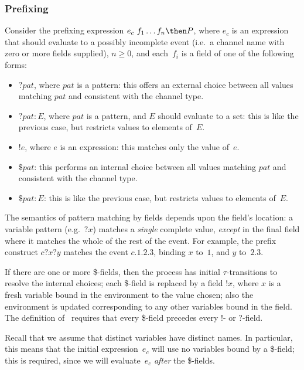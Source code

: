 \subsubsection{Prefixing}  
\label{sec:prefixing}

Consider the prefixing expression $e_c ~ f_1 \ldots f_n \then P$, where $e_c$
is an expression that should evaluate to a possibly incomplete event (i.e.~a
channel name with zero or more fields supplied), $n \ge 0$, and each~$f_i$ is
a field of one of the following forms:
  \begin{itemize}
  \item $? pat$, where $pat$ is a pattern: this offers an external choice
    between all values matching $pat$ and consistent with the channel type. 

  \item $?pat : E$, where $pat$ is a pattern, and $E$ should evaluate to a
    set: this is like the previous case, but restricts values to elements
    of~$E$. 

  \item $!e$, where $e$ is an expression: this matches only the value of~$e$. 

  \item $\$ pat$: this performs an internal choice between all values matching
    $pat$ and consistent with the channel type.
 
  \item $\$ pat : E$: this is like the previous case, but restricts values to
    elements of~$E$.
  \end{itemize}
  The semantics of pattern matching by fields depends upon the field's
  location: a variable pattern (e.g.~$?x$) matches a \emph{single} complete
  value, \emph{except} in the final field where it matches the whole of the
  rest of the event.  For example, the prefix construct $c?x?y$ matches the
  event $c.1.2.3$, binding $x$ to~$1$, and $y$ to~$2.3$.

  If there are one or more \$-fields, then the process has initial
  $\tau$-transitions to resolve the internal choices; each \$-field is
  replaced by a field $!x$, where $x$ is a fresh variable bound in the
  environment to the value chosen; also the environment is updated
  corresponding to any other variables bound in the field.  The definition of
  \CSPm\ requires that every \$-field precedes every !- or ?-field.

  Recall that we assume that distinct variables have distinct names.  In
  particular, this means that the initial expression~$e_c$ will use no
  variables bound by a \$-field; this is required, since we will
  evaluate~$e_c$ \emph{after} the \$-fields. 

